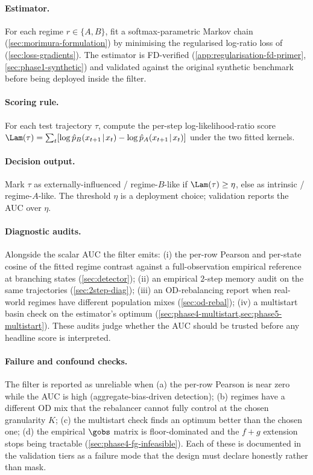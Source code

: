 \paragraph{Estimator.} For each regime $r \in \{A, B\}$, fit a
softmax-parametric Markov chain (\cref{sec:morimura-formulation}) by
minimising the regularised log-ratio loss of \cite{morimura2013}
(\cref{sec:loss-gradients}). The estimator is FD-verified
(\cref{app:regularisation-fd-primer}, \cref{sec:phase1-synthetic}) and validated against the original
synthetic benchmark before being deployed inside the filter.

\paragraph{Scoring rule.} For each test trajectory $\tau$, compute the
per-step log-likelihood-ratio score $\Lam(\tau) = \sum_t [\log
\hat{p}_B(x_{t+1}\!\mid\!x_t) - \log \hat{p}_A(x_{t+1}\!\mid\!x_t)]$
under the two fitted kernels.

\paragraph{Decision output.} Mark $\tau$ as
externally-influenced / regime-$B$-like if $\Lam(\tau) \ge \eta$, else
as intrinsic / regime-$A$-like. The threshold $\eta$ is a deployment
choice; validation reports the AUC over $\eta$.

\paragraph{Diagnostic audits.} Alongside the scalar AUC the filter
emits: (i) the per-row Pearson and per-state cosine of the fitted
regime contrast against a full-observation empirical reference at
branching states (\cref{sec:detector}); (ii) an empirical $2$-step
memory audit on the same trajectories (\cref{sec:2step-diag}); (iii) an
OD-rebalancing report when real-world regimes have different population
mixes (\cref{sec:od-rebal}); (iv) a multistart basin check on the
estimator's optimum (\cref{sec:phase4-multistart,sec:phase5-multistart}).
These audits judge whether the AUC should be trusted before any
headline score is interpreted.

\paragraph{Failure and confound checks.} The filter is reported as
unreliable when (a) the per-row Pearson is near zero while the AUC is
high (aggregate-bias-driven detection); (b) regimes have a different
OD mix that the rebalancer cannot fully control at the chosen
granularity $K$; (c) the multistart check finds an optimum better than
the chosen one; (d) the empirical $\gobs$ matrix is floor-dominated and
the $f+g$ extension stops being tractable (\cref{sec:phase4-fg-infeasible}).
Each of these is documented in the validation tiers as a failure mode
that the design must declare honestly rather than mask.


